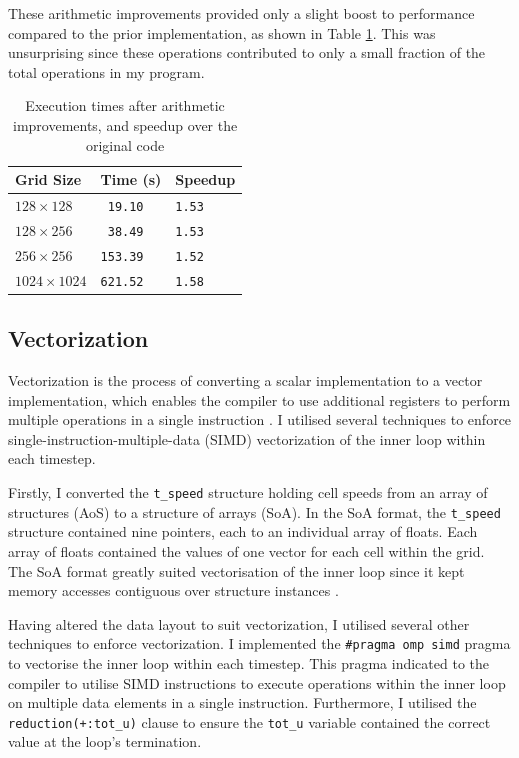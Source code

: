 \documentclass[twocolumn, a4paper]{article}
\begin{document}
These arithmetic improvements provided only a slight boost to performance compared to the prior implementation, as shown in Table \ref{tab:arithmetic_improvements}.
This was unsurprising since these operations contributed to only a small fraction of the total operations in my program.

\begin{table}[htbp]
  \begin{center}
  \caption{Execution times after arithmetic improvements, and speedup over the original code}\label{tab:arithmetic_improvements}
  \begin{tabular}{l | l l} 
      \hline\hline
      Grid Size&Time (s)&Speedup\\
      \hline
      $128 \times 128$&\texttt{ 19.10}&\texttt{1.53}\\
      $128 \times 256$&\texttt{ 38.49}&\texttt{1.53}\\
      $256 \times 256$&\texttt{153.39}&\texttt{1.52}\\
      $1024 \times 1024$&\texttt{621.52}&\texttt{1.58}\\
      \hline
    \end{tabular}
  \end{center}
\end{table}

\subsection{Vectorization}

Vectorization is the process of converting a scalar implementation to a vector implementation, which enables the compiler to use additional registers to perform multiple operations in a single instruction \cite{vectorization}.
I utilised several techniques to enforce single-instruction-multiple-data (SIMD) vectorization of the inner loop within each timestep.

Firstly, I converted the \texttt{t\_speed} structure holding cell speeds from an array of structures (AoS) to a structure of arrays (SoA).
In the SoA format, the \texttt{t\_speed} structure contained nine pointers, each to an individual array of floats.
Each array of floats contained the values of one vector for each cell within the grid.
The SoA format greatly suited vectorisation of the inner loop since it kept memory accesses contiguous over structure instances \cite{soa}.

Having altered the data layout to suit vectorization, I utilised several other techniques to enforce vectorization.
I implemented the \texttt{\#pragma omp simd} pragma to vectorise the inner loop within each timestep.
This pragma indicated to the compiler to utilise SIMD instructions to execute operations within the inner loop on multiple data elements in a single instruction.
Furthermore, I utilised the \texttt{reduction(+:tot\_u)} clause to ensure the \texttt{tot\_u} variable contained the correct value at the loop's termination.
\end{document}
